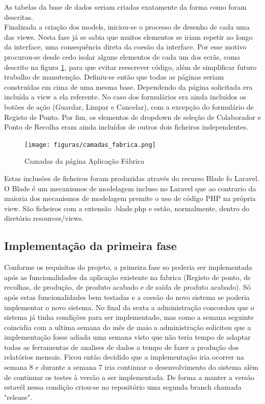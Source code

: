 \noindent
As tabelas da base de dados seriam criadas exatamente da forma como foram descritas.\\
Finalizada a criação dos models, iniciou-se o processo de desenho de cada uma das views. Nesta fase já se sabia que muitos elementos se iriam repetir ao longo da interface, uma consequência direta da coesão da interface. Por esse motivo procurou-se desde cedo isolar alguns elementos de cada um dos ecrãs, como descrito na figura \ref{fig:ui_fabrica_camadas}, para que evitar reescrever código, além de simplificar futuro trabalho de manutenção. Definiu-se então que todas as páginas seriam construídas em cima de uma mesma base. Dependendo da página solicitada era incluída a view a ela referente. No caso dos formulários era ainda incluídos os botões de ação (Guardar, Limpar e Cancelar), com a excepção do formulário de Registo de Ponto. Por fim, os elementos de dropdown de seleção de Colaborador e Ponto de Recolha eram ainda incluídos de outros dois ficheiros independentes. 
\begin{figure}[htbp] 
	\begin{center}
		\texttt{[image: figuras/camadas\_fabrica.png]}
		\caption{Camadas da página Aplicação Fábrica}
		\label{fig:ui_fabrica_camadas} 
	\end{center}
\end{figure}

\noindent
Estas inclusões de ficheiros foram produzidas através do recurso Blade fo Laravel. O Blade é um mecanismos de modelagem incluso no Laravel que ao contrario da maioria dos mecanismos de modelagem premite o uso de código PHP na própria view. São ficheiros com a extensão .blade.php e estão, normalmente, dentro do diretório resources/views\cite{Laravel}.

\subsection{Implementação da primeira fase}
Conforme os requisitos do projeto, a primeira fase so poderia ser implementada após as funcionalidades da aplicação existente na fabrica (Registo de ponto, de recolhas, de produção, de produto acabado e de saída de produto acabado). Só após estas funcionalidades bem testadas e a coesão do novo sistema se poderia implementar o novo sistema. No final da sexta a administração concordou que o sistema já tinha condições para ser implementado, mas como a semana seguinte coincidia com a ultima semana do mês de maio a administração solicitou que a implementação fosse adiada uma semana visto que não teria tempo de adaptar todas as ferramentas de analises de dados a tempo de fazer a produção dos relatórios mensais. Ficou então decidido que a implementação iria ocorrer na semana 8 e durante a semana 7 iria continuar o desenvolvimento do sistema além de continuar os testes à versão a ser implementada. De forma a manter a versão estavél nessa condição criou-se no repositório uma segunda branch chamada "release".

